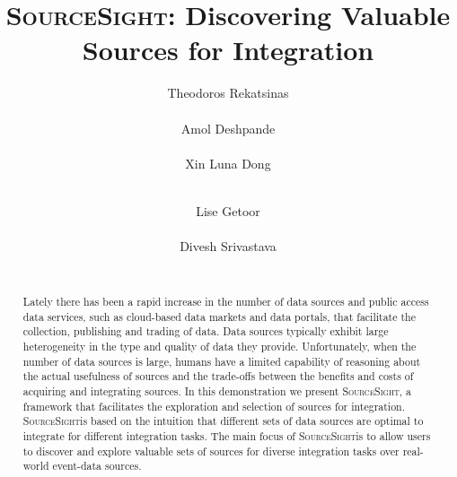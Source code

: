 \documentclass{vldb}
\newcommand\system{\textsc{SourceSight}}
\begin{document}

\title{{\LARGE \system}: Discovering Valuable Sources for Integration}


\author{
\alignauthor
Theodoros Rekatsinas\\
       \\
\alignauthor
Amol Deshpande\\
       \\
\alignauthor 
Xin Luna Dong\\
       \\
\and  %
\alignauthor 
Lise Getoor\\
       \\
\alignauthor Divesh Srivastava\\
       \\
}

\maketitle

\begin{abstract}
Lately there has been a rapid increase in the number of data sources and public access data services, such as cloud-based data markets and data portals, that facilitate the collection, publishing and trading of data. Data sources typically exhibit large heterogeneity in the type and quality of data they provide. Unfortunately, when the number of data sources is large, humans have a limited capability of reasoning about the actual usefulness of sources and the trade-offs between the benefits and costs of acquiring and integrating sources. In this demonstration we present \system , a framework that facilitates the exploration and selection of sources for integration. \system is based on the intuition that different sets of data sources are optimal to integrate for different integration tasks. The main focus of \system is to allow users to discover and explore valuable sets of sources for diverse integration tasks over real-world event-data sources.
\end{abstract}
\end{document}
